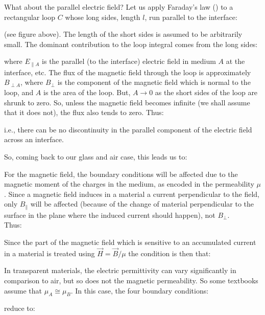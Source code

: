 	What about the parallel electric field? Let us apply Faraday's law () to a rectangular loop $C$ whose long sides, length $l$, run parallel to the interface:
		
	(see figure above). The length of the short sides is assumed to be arbitrarily small. The dominant contribution to the loop integral comes from the long sides:
	
	where $E_{\parallel A}$ is the parallel (to the interface) electric field in medium $A$ at the interface, etc. The flux of the magnetic field through the loop is approximately $B_{\perp A}$, where $B_\perp$ is the component of the magnetic field which is normal to the loop, and $A$ is the area of the loop. But, $A\rightarrow 0$ as the short sides of the loop are shrunk to zero. So, unless the magnetic field becomes infinite (we shall assume that it does not), the flux also tends to zero. Thus:
	
	i.e., there can be no discontinuity in the parallel component of the electric field across an interface.
	
	So, coming back to our glass and air case, this leads us to\label{boundary condition for refraction}:
	
	
	\begin{tcolorbox}[title=Remark,colframe=black,arc=10pt]
	For the magnetic field, the boundary conditions will be affected due to the magnetic moment of the charges in the medium, as encoded in the permeability $\mu$. Since a magnetic field induces in a material a current perpendicular to the field, only $B_\parallel$ will be affected (because of the change of material perpendicular to the surface in the plane where the induced current should happen), not $B_\perp$.\\

	Thus:
	
	Since the part of the magnetic field which is sensitive to an accumulated current in a material is
	treated using $\vec{H}=\vec{B}/\mu$ the condition is then that:
	
	\end{tcolorbox}
	
	In transparent materials, the electric permittivity can vary significantly in comparison to air, but so does not the magnetic permeability. So some textbooks assume that $\mu_A\cong \mu_B$. In this case, the four boundary conditions:
	
	reduce to:
	
